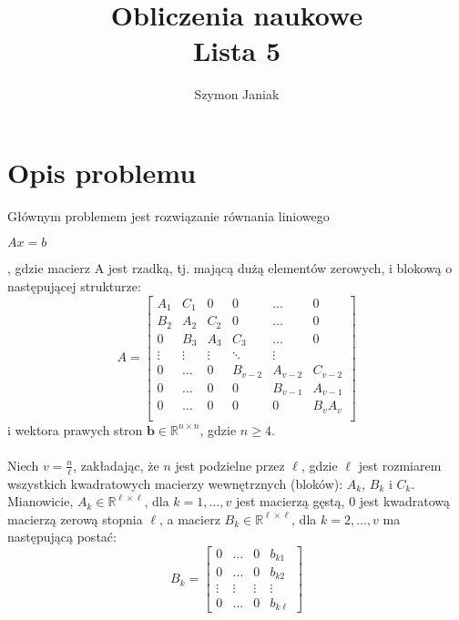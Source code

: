 \documentclass{article}
\title{%
	Obliczenia naukowe \\
	\large Lista 5}
\author{Szymon Janiak}
\begin{document}
\maketitle

\section*{Opis problemu}
	Głównym problemem jest rozwiązanie równania liniowego\\
	\centerline{$Ax = b$},
	gdzie macierz A jest rzadką, tj. mającą dużą elementów zerowych, i blokową o następującej strukturze:\\
	\[
	A = \begin{bmatrix}
	A_1 & C_1 & 0 & 0 & \dots & 0 \\
	B_2 & A_2 & C_2 & 0 & \dots & 0 \\
	0 & B_3 & A_3 & C_3 & \dots & 0 \\
	\vdots & \vdots & \vdots & \ddots & \vdots \\
	0 & \dots & 0 & B_{v-2} & A_{v-2} & C_{v-2} \\
	0 & \dots & 0 & 0 & B_{v-1} & A_{v-1} \\
	0 & \dots & 0 & 0 & 0 & B_v A_v \\
	\end{bmatrix}
	\]
	i wektora prawych stron $\mathbf{b} \in \mathbb{R}^{n \times n}$, gdzie $n \geq 4$.\\
	\\
	Niech $v = \frac{n}{\ell}$, zakładając, że $n$ jest podzielne przez $\ell$, gdzie $\ell$ jest rozmiarem wszystkich kwadratowych macierzy wewnętrznych (bloków): $A_k$, $B_k$ i $C_k$. Mianowicie, $A_k \in \mathbb{R}^{\ell \times \ell}$, dla $k = 1, \ldots, v$ jest macierzą gęstą, $0$ jest kwadratową macierzą zerową stopnia $\ell$, a macierz $B_k \in \mathbb{R}^{\ell \times \ell}$, dla $k = 2, \ldots, v$ ma następującą postać:\\
	\[
	B_k = \begin{bmatrix}
	    0 & \dots & 0 & b_{k1} \\
	    0 & \dots & 0 & b_{k2} \\
	    \vdots & \vdots & \vdots & \vdots \\
	    0 & \dots & 0 & b_{k\ell}
	\end{bmatrix}
	\]\\
\end{document}
